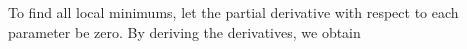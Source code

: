 To find all local minimums, let the partial derivative with respect to each parameter be zero. By deriving the derivatives, we obtain
